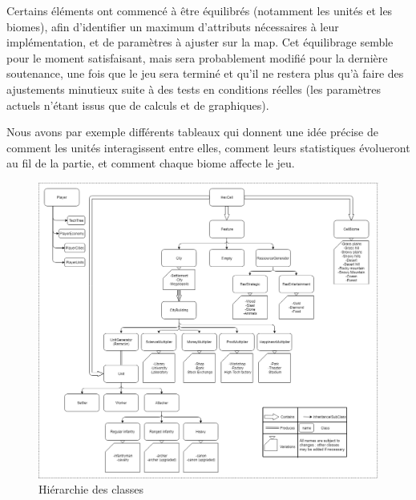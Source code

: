 \documentclass[12pt]{report}
\begin{document}
Certains éléments ont commencé à être équilibrés (notamment les unités et les biomes), afin d’identifier un maximum d’attributs nécessaires à leur implémentation, et de paramètres à ajuster sur la map. Cet équilibrage semble pour le moment satisfaisant, mais sera probablement modifié pour la dernière soutenance, une fois que le jeu sera terminé et qu’il ne restera plus qu’à faire des ajustements minutieux suite à des tests en conditions réelles (les paramètres actuels n’étant issus que de calculs et de graphiques).

Nous avons par exemple différents tableaux qui donnent une idée précise de comment les unités interagissent entre elles, comment leurs statistiques évolueront au fil de la partie, et comment chaque biome affecte le jeu.

\begin{figure}[H]
    \centering
    \includegraphics[width=1\textwidth]{DIAG_CLASSES__hierarchy}
    \caption{Hiérarchie des classes}
\end{figure}
\end{document}
